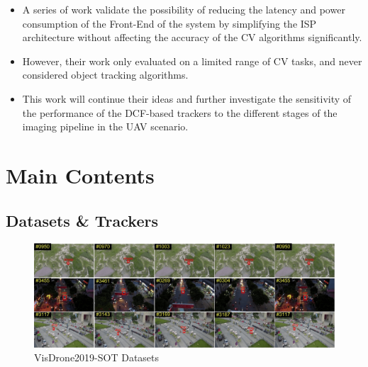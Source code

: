 \documentclass{beamer}
\begin{document}
\begin{frame}
    \begin{itemize}[<+-| alert@+>]
        \item A series of work validate the possibility of reducing the latency and power consumption of the Front-End of the system by simplifying the ISP architecture without affecting the accuracy of the CV algorithms significantly.
        \item However, their work only evaluated on a limited range of CV tasks, and never considered object tracking algorithms.
        \item This work will continue their ideas and further investigate the sensitivity of the performance of the DCF-based trackers to the different stages of the imaging pipeline in the UAV scenario.
    \end{itemize}
\end{frame}

\section{Main Contents}

\subsection{Datasets \& Trackers}

\begin{frame}
    \begin{figure}[htpb]
        \begin{center}
            \includegraphics[width=1.0\linewidth]{fig/VisDrone.png}
            \caption{VisDrone2019-SOT Datasets}
        \end{center}
    \end{figure}
\end{frame}
\end{document}
